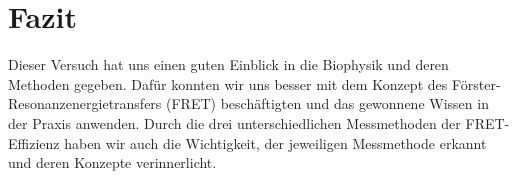 
\chapter{Fazit}
\label{chap:fazit}

Dieser Versuch hat uns einen guten Einblick in die Biophysik und deren Methoden gegeben. Dafür konnten wir uns besser mit dem Konzept des Förster-Resonanzenergietransfers (FRET) beschäftigten und das gewonnene Wissen in der Praxis anwenden. Durch die drei unterschiedlichen Messmethoden der FRET-Effizienz haben wir auch die Wichtigkeit, der jeweiligen Messmethode erkannt und deren Konzepte verinnerlicht.